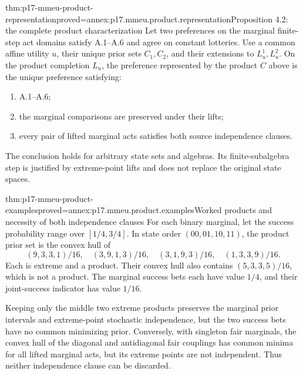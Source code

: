 \begin{hbtheorem}{thm:p17-mmeu-product-representation}{proved=annex:p17.mmeu.product.representation}{Proposition 4.2: the complete product characterization}
Let two preferences on the marginal finite-step act domains
satisfy A.1--A.6 and agree on constant lotteries.
Use a common affine utility \(u\), their unique prior sets
\(C_1,C_2\), and their extensions to \(L_u^1,L_u^2\).
On the product completion \(L_u\), the preference represented
by the product \(C\) above is the unique preference satisfying:
\begin{enumerate}
\item A.1--A.6;
\item the marginal comparisons are preserved under their lifts;
\item every pair of lifted marginal acts satisfies both
source independence clauses.
\end{enumerate}
The conclusion holds for arbitrary state sets and algebras.
Its finite-subalgebra step is justified by extreme-point
lifts and does not replace the original state spaces.
\end{hbtheorem}

\begin{hbtheorem}{thm:p17-mmeu-product-examples}{proved=annex:p17.mmeu.product.examples}{Worked products and necessity of both independence clauses}
For each binary marginal, let the success probability range
over \([1/4,3/4]\). In state order \((00,01,10,11)\), the
product prior set is the convex hull of
\[
 (9,3,3,1)/16,\quad(3,9,1,3)/16,\quad
 (3,1,9,3)/16,\quad(1,3,3,9)/16 .
\]
Each is extreme and a product. Their convex hull also contains
\((5,3,3,5)/16\), which is not a product.
The marginal success bets each have value \(1/4\), and
their joint-success indicator has value \(1/16\).

Keeping only the middle two extreme products preserves the
marginal prior intervals and extreme-point stochastic independence,
but the two success bets have no common minimizing prior.
Conversely, with singleton fair marginals, the convex hull of
the diagonal and antidiagonal fair couplings has common minima
for all lifted marginal acts, but its extreme points are
not independent. Thus neither independence clause can be discarded.
\end{hbtheorem}
